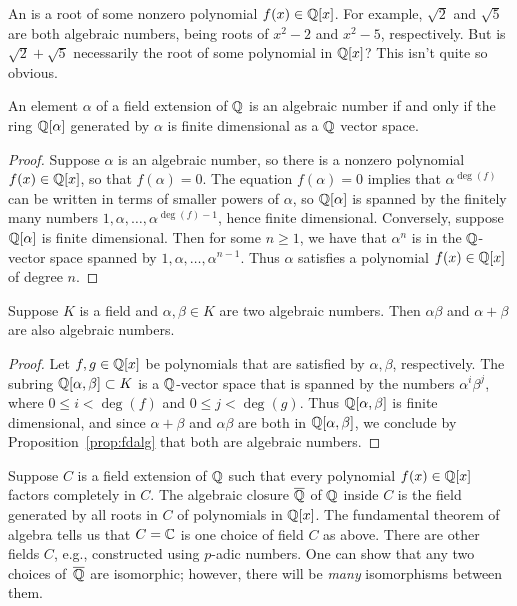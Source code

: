 An  is a root of some nonzero polynomial $f(x) \in \mathbb{Q}[x]$.
For example, $\sqrt{2}$ and $\sqrt{5}$ are both algebraic numbers, being 
roots of $x^2-2$ and $x^2-5$, respectively.
But is $\sqrt{2} + \sqrt{5}$ necessarily the root of some polynomial in $\mathbb{Q}[x]$?
This isn't quite so obvious.

\begin{proposition}\label{prop:fdalg}
An element $\alpha$ of a field extension of $\mathbb{Q}$ is an algebraic
number if and only if the ring $\mathbb{Q}[\alpha]$ generated by $\alpha$ is
finite dimensional as a $\mathbb{Q}$ vector space.
\end{proposition}
\begin{proof}
Suppose $\alpha$ is an algebraic number, so there is a nonzero polynomial $f(x)\in\mathbb{Q}[x]$,
so that $f(\alpha)=0$.  The equation $f(\alpha)=0$ implies that
$\alpha^{\deg(f)}$ can be written in terms of smaller powers of $\alpha$, so $\mathbb{Q}[\alpha]$
is spanned by the finitely many numbers $1,\alpha,\ldots,\alpha^{\deg(f)-1}$, hence finite dimensional.
Conversely, suppose $\mathbb{Q}[\alpha]$ is finite dimensional.  Then for some $n\geq 1$, 
we have that $\alpha^n$ is in the $\mathbb{Q}$-vector space spanned by $1,\alpha,\ldots, \alpha^{n-1}$.
Thus $\alpha$ satisfies a polynomial $f(x) \in \mathbb{Q}[x]$ of degree $n$.
\end{proof}

\begin{proposition}\label{prop:algnumfield}
Suppose $K$ is a field and $\alpha, \beta\in K$ are two algebraic
numbers.  Then $\alpha\beta$ and $\alpha+\beta$ are also algebraic numbers.
\end{proposition}
\begin{proof}
Let $f, g\in\mathbb{Q}[x]$ be polynomials that are satisfied by $\alpha,\beta$, respectively.
The subring $\mathbb{Q}[\alpha,\beta]\subset K$ is a $\mathbb{Q}$-vector space that
is spanned by the numbers $\alpha^i\beta^j$, where $0\leq i<\deg(f)$
and $0\leq j<\deg(g)$.  Thus $\mathbb{Q}[\alpha,\beta]$ is finite dimensional, and
since $\alpha+\beta$ and $\alpha\beta$ are both in $\mathbb{Q}[\alpha,\beta]$,
we conclude by Proposition~\ref{prop:fdalg} that both
are algebraic numbers. 
\end{proof}

Suppose $C$ is a field extension of $\mathbb{Q}$ such that every polynomial
$f(x)\in \mathbb{Q}[x]$ factors completely in $C$.  
The algebraic closure $\overline{\mathbb{Q}}$ of $\mathbb{Q}$ inside $C$
is the  field generated by all roots in $C$ of polynomials
in $\mathbb{Q}[x]$.
The fundamental theorem of algebra tells us that
$C=\mathbb{C}$ is one choice of field $C$ as above.
There are other fields $C$, e.g., constructed using $p$-adic numbers.
One can show that any two choices of~$\overline{\mathbb{Q}}$ are isomorphic; however,
there will be {\em many} isomorphisms between them.   

